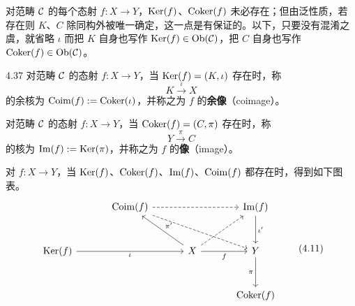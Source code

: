 对范畴 $\mathcal{C}$ 的每个态射 $f\colon X\to Y$，$\operatorname{Ker}(f)$、$\operatorname{Coker}(f)$ 未必存在；但由泛性质，若存在则 $K$、$C$ 除同构外被唯一确定，这一点是有保证的。以下，只要没有混淆之虞，就省略 $\iota$ 而把 $K$ 自身也写作 $\operatorname{Ker}(f)\in\operatorname{Ob}(\mathcal{C})$，把 $C$ 自身也写作 $\operatorname{Coker}(f)\in\operatorname{Ob}(\mathcal{C})$。

\begin{definition}{4.37}
对范畴 $\mathcal{C}$ 的态射 $f\colon X\to Y$，当 $\operatorname{Ker}(f)=(K,\iota)$ 存在时，称
\[ K\xrightarrow{\ \iota\ }X \]
的余核为 $\operatorname{Coim}(f):=\operatorname{Coker}(\iota)$，并称之为 $f$ 的\textbf{余像}（coimage）。

对范畴 $\mathcal{C}$ 的态射 $f\colon X\to Y$，当 $\operatorname{Coker}(f)=(C,\pi)$ 存在时，称
\[ Y\xrightarrow{\ \pi\ }C \]
的核为 $\operatorname{Im}(f):=\operatorname{Ker}(\pi)$，并称之为 $f$ 的\textbf{像}（image）。
\end{definition}

对 $f\colon X\to Y$，当 $\operatorname{Ker}(f)$、$\operatorname{Coker}(f)$、$\operatorname{Im}(f)$、$\operatorname{Coim}(f)$ 都存在时，得到如下图表。
\begin{equation}
\begin{tikzcd}[row sep=2.8em, column sep=3.2em]
  & \Coim(f) \arrow[rr,dashed] \arrow[drr,dashed] & & \Img(f) \arrow[d,"\iota'"] \\
  \Ker(f) \arrow[rr,"\iota"'] & & X \arrow[ul,"\pi'"'] \arrow[r,"f"'] \arrow[ur,dashed] & Y \arrow[d,"\pi"'] \\
  & & & \Coker(f)
\end{tikzcd} \tag{4.11}
\end{equation}

